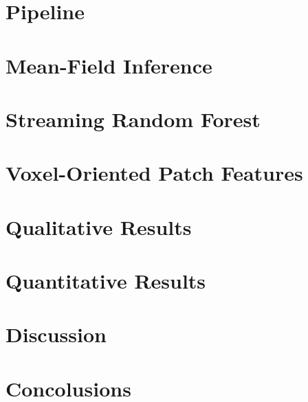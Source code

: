 \documentclass{llncs}
\begin{document}
%     
%     
%     
%     
%     
   


  
\section{Pipeline}
\section{Mean-Field Inference}
\section{Streaming Random Forest}
\section{Voxel-Oriented Patch Features}
\section{Qualitative Results}
\section{Quantitative Results}
\section{Discussion}
\section{Concolusions}
\end{document}
